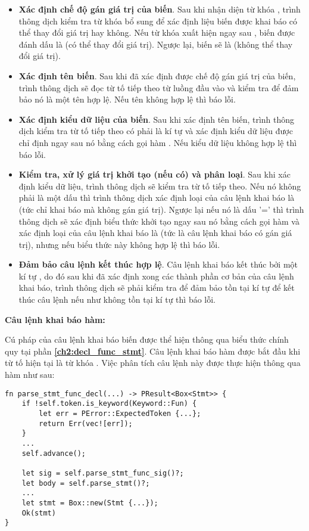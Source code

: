 \begin{itemize}
    \item \textbf{Xác định chế độ gán giá trị của biến}. Sau khi nhận diện từ khóa , trình thông dịch kiểm tra từ khóa bổ sung để xác định liệu biến được khai báo có thể thay đổi giá trị hay không. Nếu từ khóa  xuất hiện ngay sau , biến được đánh dấu là  (có thể thay đổi giá trị). Ngược lại, biến sẽ là  (không thể thay đổi giá trị).
    \item \textbf{Xác định tên biến}. Sau khi đã xác định được chế độ gán giá trị của biến, trình thông dịch sẽ đọc từ tố tiếp theo từ luồng đầu vào và kiểm tra để đảm bảo nó là một tên hợp lệ. Nếu tên không hợp lệ thì báo lỗi. 
    \item \textbf{Xác định kiểu dữ liệu của biến}. Sau khi xác định tên biến, trình thông dịch kiểm tra từ tố tiếp theo có phải là kí tự \kw{:} và xác định kiểu dữ liệu được chỉ định ngay sau nó bằng cách gọi hàm . Nếu kiểu dữ liệu không hợp lệ thì báo lỗi. 
    \item \textbf{Kiểm tra, xử lý giá trị khởi tạo (nếu có) và phân loại}. Sau khi xác định kiểu dữ liệu, trình thông dịch sẽ kiểm tra từ tố tiếp theo. Nếu nó không phải là một dấu \kw{=} thì trình thông dịch xác định loại của câu lệnh khai báo là  (tức chỉ khai báo mà không gán giá trị). Ngược lại nếu nó là dấu '=' thì trình thông dịch sẽ xác định biểu thức khởi tạo ngay sau nó bằng cách gọi hàm  và xác định loại của câu lệnh khai báo là  (tức là câu lệnh khai báo có gán giá trị), nhưng nếu biểu thức này không hợp lệ thì báo lỗi. 
    \item \textbf{Đảm bảo câu lệnh kết thúc hợp lệ}. Câu lệnh khai báo kết thúc bởi một kí tự \kw{;}, do đó sau khi đã xác định xong các thành phần cơ bản của câu lệnh khai báo, trình thông dịch sẽ phải kiểm tra để đảm bảo tồn tại kí tự \kw{;} để kết thúc câu lệnh nếu như không tồn tại kí tự \kw{;} thì báo lỗi.
\end{itemize}


\noindent\textbf{Câu lệnh khai báo hàm:}

Cú pháp của câu lệnh khai báo biến được thể hiện thông qua biểu thức chính quy tại phần \textbf{\ref{ch2:decl_func_stmt}}. Câu lệnh khai báo hàm được bắt đầu khi từ tố hiện tại là từ khóa . Việc phân tích câu lệnh này được thực hiện thông qua hàm  như sau:

\begin{lstlisting}[]
fn parse_stmt_func_decl(...) -> PResult<Box<Stmt>> {
    if !self.token.is_keyword(Keyword::Fun) {
        let err = PError::ExpectedToken {...};
        return Err(vec![err]);
    }
    ...
    self.advance();

    let sig = self.parse_stmt_func_sig()?;
    let body = self.parse_stmt()?;
    ...
    let stmt = Box::new(Stmt {...});
    Ok(stmt)
}
\end{lstlisting}

